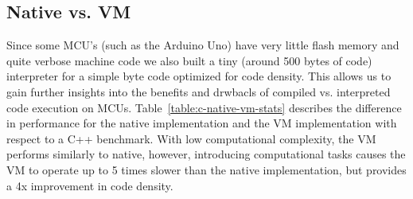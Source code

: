 


\subsection{\MC Native vs. \MC VM}

Since some MCU's (such as the Arduino Uno) have very little flash memory and quite 
verbose machine code we also built a tiny (around 500 bytes of code) interpreter 
for a simple byte code optimized for code density. This allows us to gain further insights into the 
benefits and drwbacls of compiled vs. interpreted code execution on MCUs.
Table~\ref{table:c-native-vm-stats} describes the difference in performance for the native implementation and the VM implementation with respect to a C++ benchmark. With low computational complexity, the VM performs similarly to native, however, introducing computational tasks causes the VM to operate up to 5 times slower than the native implementation, but provides a 4x improvement in code density.


